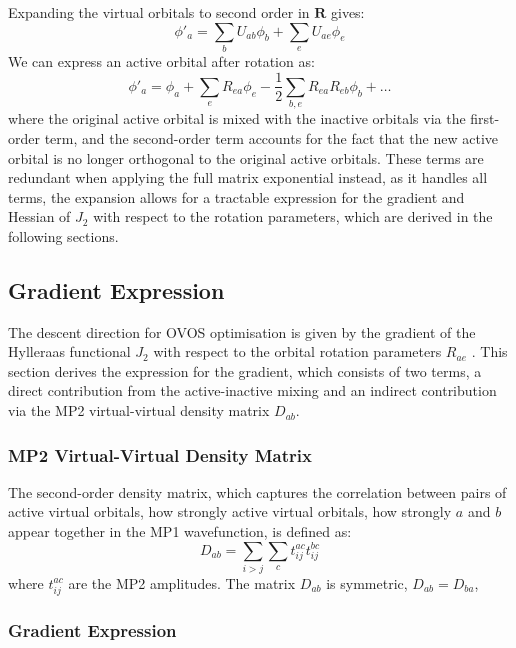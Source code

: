 Expanding the virtual orbitals to second order in $\mathbf{R}$ gives:
\begin{equation}
    \phi'_a = \sum_b U_{ab} \phi_b + \sum_e U_{ae} \phi_e
\end{equation}
We can express an active orbital after rotation as:
\begin{equation}
    \phi'_a = \phi_a + \sum_e R_{ea}\phi_e - \frac{1}{2}\sum_{b,e} R_{ea}R_{eb}\phi_b + \ldots
\end{equation}
where the original active orbital is mixed with the inactive orbitals via the first-order term, and the second-order term accounts for the fact that the new active orbital is no longer orthogonal to the original active orbitals. These terms are redundant when applying the full matrix exponential instead, as it handles all terms, the expansion allows for a tractable expression for the gradient and Hessian of $J_2$ with respect to the rotation parameters, which are derived in the following sections.



\subsection{Gradient Expression}

The descent direction for OVOS optimisation is given by the gradient of the Hylleraas functional $J_2$ with respect to the orbital rotation parameters $R_{ae}$ \cite{Adamowicz1987}. This section derives the expression for the gradient, which consists of two terms, a direct contribution from the active-inactive mixing and an indirect contribution via the MP2 virtual-virtual density matrix $D_{ab}$.


\subsubsection{MP2 Virtual-Virtual Density Matrix}

The second-order density matrix, which captures the correlation between pairs of active virtual orbitals, how strongly active virtual orbitals, how strongly $a$ and $b$ appear together in the MP1 wavefunction, is defined as:
\begin{equation}
    D_{ab} = \sum_{i>j}\sum_c t_{ij}^{ac} t_{ij}^{bc}
\end{equation}
where $t_{ij}^{ac}$ are the MP2 amplitudes. The matrix $D_{ab}$ is symmetric, $D_{ab} = D_{ba}$, 

\subsubsection{Gradient Expression}
\label{subsubsec:gradient}

